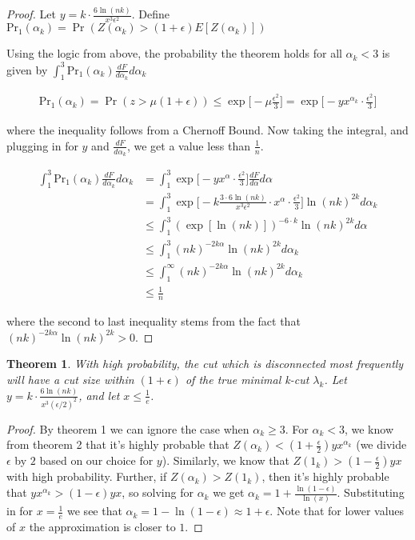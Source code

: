 \documentclass{acm_proc_article-sp}
\newtheorem{theorem}{Theorem}
\begin{document}
\begin{proof}
Let $y = k \cdot \frac{6 \ln(nk)}{x^3 \epsilon^2}$. Define $\text{Pr}_1(\alpha_k) = \Pr(Z(\alpha_k) > (1+\epsilon) E[Z(\alpha_k)])$

Using the logic from above, the probability the theorem holds for all $\alpha_k < 3$ is given by $\int_{1}^3 \text{Pr}_1(\alpha_k) \frac{dF}{d \alpha_k} d\alpha_k$

\begin{align*}
\text{Pr}_1(\alpha_k) = \Pr(z > \mu(1 + \epsilon)) \leq \exp \bigg[ -\mu \frac{\epsilon^2}{3}\bigg] = \exp \bigg[-y x^{\alpha_k} \cdot \frac{\epsilon^2}{3} \bigg]
\end{align*}

where the inequality follows from a Chernoff Bound. Now taking the integral, and plugging in for $y$ and $\frac{dF}{d \alpha_k}$, we get a value less than $\frac{1}{n}$.

\begin{align*}
\int_{1}^3 \text{Pr}_1(\alpha_k) \frac{dF}{d \alpha_k} d\alpha_k &= \int_{1}^3 \exp \bigg[-y x^\alpha \cdot \frac{\epsilon^2}{3} \bigg] \frac{dF}{d \alpha} d\alpha \\
&= \int_{1}^{3} \exp \bigg[-k \frac{3 \cdot 6 \ln (nk)}{x^3 \epsilon^2} \cdot x^\alpha \cdot \frac{\epsilon^2}{3}\bigg] \ln(nk)^{2k} d\alpha_k \\
&\leq \int_{1}^3 (\exp[\ln(nk)])^{-6\cdot k} \ln(nk)^{2k} d\alpha \\
&\leq \int_{1}^3 (nk)^{-2 k \alpha} \ln(nk)^{2k} d\alpha_k \\
&\leq \int_{1}^\infty (nk)^{-2k \alpha} \ln(nk)^{2k} d\alpha_k \\
&\leq \frac{1}{n}
\end{align*}

where the second to last inequality stems from the fact that \newline $(nk)^{-2k \alpha} \ln(nk)^{2k}  > 0$.

\end{proof}

\begin{theorem}
With high probability, the cut which is disconnected most frequently will have a cut size within $(1+\epsilon)$ of the true minimal k-cut $\lambda_k$. Let $y = k \cdot \frac{6 \ln(nk)}{x^3 (\epsilon/2)^2}$, and let $x \leq \frac{1}{e}$.
\end{theorem}

\begin{proof}
By theorem 1 we can ignore the case when $\alpha_k \geq 3$. For $\alpha_k < 3$, we know from theorem 2 that it's highly probable that $Z(\alpha_k) < (1+\frac{\epsilon}{2})yx^{\alpha_k}$ (we divide $\epsilon$ by $2$ based on our choice for $y$).
Similarly, we know that $Z(1_k) > (1-\frac{\epsilon}{2}) yx$ with high probability. Further, if $Z(\alpha_k) > Z(1_k)$, then it's highly probable that $yx^{\alpha_k} > (1-\epsilon) yx$, so solving for $\alpha_k$ we get $\alpha_k = 1 + \frac{\ln(1-\epsilon)}{\ln(x)}$. Substituting in for $x = \frac{1}{e}$ we see that $\alpha_k = 1 - \ln(1 - \epsilon) \approx 1+\epsilon$. Note that for lower values of $x$ the approximation is closer to $1$.
\end{proof}
\end{document}
